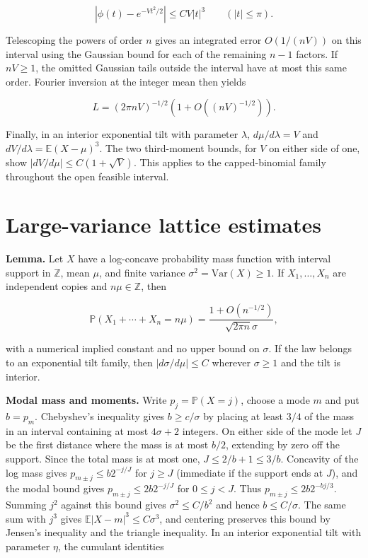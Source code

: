 \documentclass[11pt]{article}
\begin{document}
\[
|\phi(t)-e^{-Vt^2/2}|\le C V|t|^3\qquad (|t|\le\pi).
\]

Telescoping the powers of order $n$ gives an integrated error $O(1/(nV))$ on this interval using the Gaussian bound for each of the remaining $n-1$ factors. If $nV\ge1$, the omitted Gaussian tails outside the interval have at most this same order. Fourier inversion at the integer mean then yields

\[
L=(2\pi nV)^{-1/2}\left(1+O((nV)^{-1/2})\right).
\]

Finally, in an interior exponential tilt with parameter $\lambda$, $d\mu/d\lambda=V$ and $dV/d\lambda=\mathbb E(X-\mu)^3$. The two third-moment bounds, for $V$ on either side of one, show $|dV/d\mu|\le C(1+\sqrt V)$. This applies to the capped-binomial family throughout the open feasible interval.

\section{Large-variance lattice estimates}
\label{app:large-var}

\textbf{Lemma.} Let $X$ have a log-concave probability mass function with interval support in $\mathbb Z$, mean $\mu$, and finite variance $\sigma^2=\mathrm{Var}(X)\ge1$. If $X_1,\ldots,X_n$ are independent copies and $n\mu\in\mathbb Z$, then

\[
\mathbb P(X_1+\cdots+X_n=n\mu)
=\frac{1+O(n^{-1/2})}{\sqrt{2\pi n} \sigma},
\]

with a numerical implied constant and no upper bound on $\sigma$. If the law belongs to an exponential tilt family, then $|d\sigma/d\mu|\le C$ wherever $\sigma\ge1$ and the tilt is interior.

\textbf{Modal mass and moments.} Write $p_j=\mathbb P(X=j)$, choose a mode $m$ and put $b=p_m$. Chebyshev's inequality gives $b\ge c/\sigma$ by placing at least $3/4$ of the mass in an interval containing at most $4\sigma+2$ integers. On either side of the mode let $J$ be the first distance where the mass is at most $b/2$, extending by zero off the support. Since the total mass is at most one, $J\le 2/b+1\le3/b$. Concavity of the log mass gives $p_{m\pm j}\le b 2^{-j/J}$ for $j\ge J$ (immediate if the support ends at $J$), and the modal bound gives $p_{m\pm j}\le2b 2^{-j/J}$ for $0\le j<J$. Thus $p_{m\pm j}\le2b 2^{-bj/3}$. Summing $j^2$ against this bound gives $\sigma^2\le C/b^2$ and hence $b\le C/\sigma$. The same sum with $j^3$ gives $\mathbb E|X-m|^3\le C\sigma^3$, and centering preserves this bound by Jensen's inequality and the triangle inequality. In an interior exponential tilt with parameter $\eta$, the cumulant identities
\end{document}
